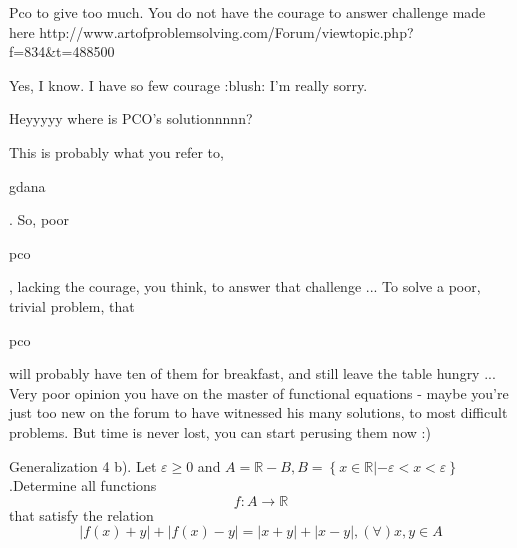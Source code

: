 \begin{solution}
	\begin{tcolorbox}Pco to give too much.
You do not have the courage to answer challenge made here
http://www.artofproblemsolving.com/Forum/viewtopic.php?f=834&t=488500\end{tcolorbox}
Yes, I know.
I have so few courage :blush:
I'm really sorry.
\end{solution}



\begin{solution}
	\begin{tcolorbox}Heyyyyy where is PCO's solutionnnnn?\end{tcolorbox}
This is probably what you refer to, \begin{bolded}gdana\end{bolded}. So, poor \begin{bolded}pco\end{bolded}, lacking the courage, you think, to answer that challenge ... To solve a poor, trivial problem, that \begin{bolded}pco\end{bolded} will probably have ten of them for breakfast, and still leave the table hungry ... Very poor opinion you have on the master of functional equations - maybe you're just too new on the forum to have witnessed his many solutions, to most difficult problems. But time is never lost, you can start perusing them now :)
\end{solution}



\begin{solution}
	Generalization 4                                                  
 b). Let $\varepsilon \ge 0$ and $A=\mathbb{R}-B,B=\left\{ x\in \mathbb{R}|-\varepsilon <x<\varepsilon  \right\}$.Determine all functions 
	\[f:A\to \mathbb{R}\]
 that satisfy the relation \[\left| f(x)+y \right|+\left| f(x)-y \right|=\left| x+y \right|+\left| x-y \right|,\left( \forall  \right)x,y\in A\]
\end{solution}



